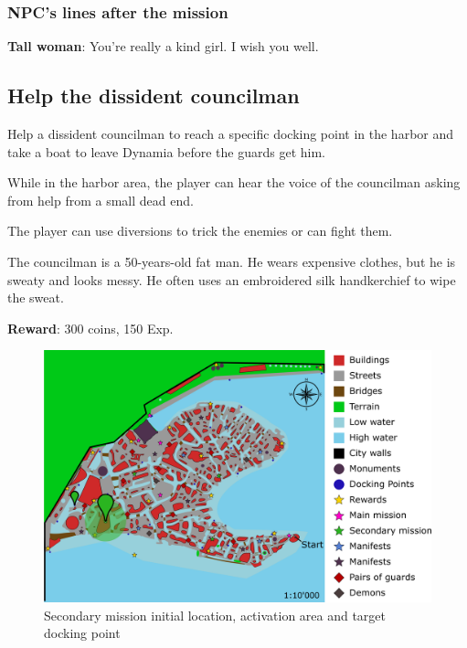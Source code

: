 \subsubsection*{NPC's lines after the mission}
\textbf{Tall woman}: You're really a kind girl. I wish you well.



\subsection{Help the dissident councilman}
Help a dissident councilman to reach a specific docking point in the harbor and take a boat to leave Dynamia before the guards get him.

While in the harbor area, the player can hear the voice of the councilman asking from help from a small dead end.

The player can use diversions to trick the enemies or can fight them.

The councilman is a 50-years-old fat man. He wears expensive clothes, but he is sweaty and looks messy. He often uses an embroidered silk handkerchief to wipe the sweat.

\textbf{Reward}: 300 coins, 150 Exp.

\begin{figure}[H]
  \centering
  \includegraphics[width=\textwidth]{../Images/Maps/dynamiaSecondaryMissions_Councilman}
  \caption{Secondary mission initial location, activation area and target docking point}
\end{figure}

